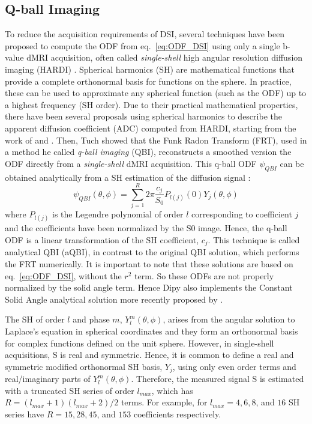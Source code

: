 \documentclass{bioinfo}
\begin{document}
\subsection{Q-ball Imaging}
To reduce the acquisition requirements of DSI, several techniques
have been proposed to compute the ODF from eq.~\ref{eq:ODF_DSI}
using only a single b-value dMRI acquisition, often called
\emph{single-shell} high angular resolution diffusion imaging (HARDI)
\citep{tuch-reese-etal:02,descoteaux-deriche-etal:11}.
Spherical harmonics (SH) are mathematical functions that provide
a complete orthonormal basis for functions on the sphere. In practice, these
can be used to approximate any spherical function (such as the ODF) up to a
highest frequency (SH order). Due to their practical mathematical properties,
there have been several proposals using spherical harmonics to describe
the apparent diffusion coefficient (ADC) computed from HARDI, starting from the
work of \citet{Frank2001, Frank2002, alexander-barker-etal:02} and
\citet{tuch-reese-etal:02}. Then, Tuch showed that the Funk Radon Transform
(FRT), used in a method he called \emph{q-ball imaging} (QBI),
reconstructs a smoothed version the ODF directly from a
\emph{single-shell} dMRI acquisition. This q-ball ODF $\psi_{QBI}$ can
be obtained analytically from a
SH estimation of the diffusion signal \citep{descoteaux-angelino-etal:07,
  hess-mukherjee-etal:06, anderson:05}:
\begin{equation}\label{eq.qball}
\psi_{QBI}(\theta, \phi) = \sum_{j=1}^{R} 2\pi \frac{c_j}{S_0} P_{l(j)} (0) Y_{j} (\theta, \phi)
\end{equation}
where $P_{l(j)}$ is the Legendre polynomial of order $l$ corresponding to
coefficient $j$ and the coefficients have been normalized by the S0
image. Hence, the q-ball ODF is a linear transformation of the SH coefficient,
$c_j$. This technique is called analytical QBI (aQBI), in contrast to the
original QBI solution, which performs the FRT numerically. It is
important to note that these solutions are based on
eq.~\ref{eq:ODF_DSI}, without the $r^2$ term. So these ODFs are
not properly normalized by the solid angle term. Hence Dipy also implements
the Constant Solid Angle analytical solution more recently proposed by
\citep{aganj-lenglet-etal:10,tristan-vega-westin-etal:09}.

The SH of order $l$
and phase $m$, $Y_{l}^{m}(\theta, \phi)$, arises from the angular solution to
Laplace's equation in spherical coordinates and they form an orthonormal basis
for complex functions defined on the unit sphere. However, in single-shell
acquisitions, S is real and symmetric. Hence, it is common to define a real and
symmetric modified orthonormal SH basis, $Y_{j}$, using only even order terms
and real/imaginary parts of $Y_{l}^{m}(\theta, \phi)$. Therefore, the measured
signal S is estimated with a truncated SH series of order $l_{max}$, which has
$R = (l_{max} +1)( l_{max} +2)/2$ terms. For example, for $l_{max} = 4, 6, 8$,
and $16$ SH series have $R = 15, 28, 45$, and $153$ coefficients respectively.
\end{document}
